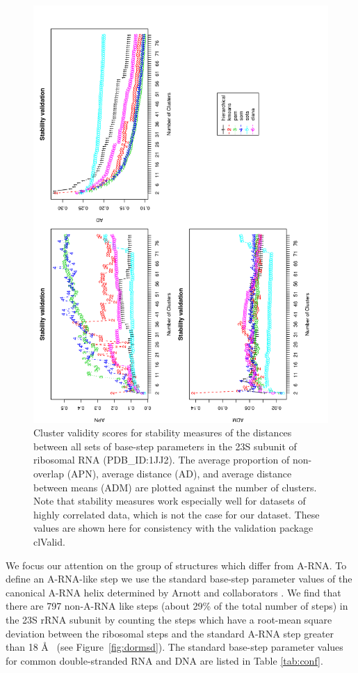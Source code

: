 \begin{figure}
 \centering
\includegraphics[angle=0, scale=0.34]{Chapter2/STval_sta.png}
\caption{Cluster  validity  scores   for  stability  measures  of  the
  distances  between  all sets  of  base-step  parameters  in the  23S
  subunit of  ribosomal RNA (PDB\_ID:1JJ2). The  average proportion of
  non-overlap  (APN),  average  distance  (AD), and  average  distance
  between  means (ADM)  are plotted  against the  number  of clusters.
  Note that  stability measures work  especially well for  datasets of
  highly  correlated data,  which is  not  the case  for our  dataset.
  These  values are  shown here  for consistency  with  the validation
  package clValid.}
 \label{fig:stability}
\end{figure}

We focus  our attention on the  group of structures  which differ from
A-RNA.  To  define an  A-RNA-like step  we use the  standard base-step
parameter values of the canonical A-RNA helix determined by Arnott and
collaborators \cite{arnott1973}.  We find that there are 797 non-A-RNA
like steps (about  29\% of the total number of steps)  in the 23S rRNA
subunit by counting the steps  which have a root-mean square deviation
between the ribosomal  steps and the standard A-RNA  step greater than
18 \AA~ (see Figure~\ref{fig:dormsd}). The standard base-step parameter
values  for common  double-stranded RNA  and DNA  are listed  in Table
\ref{tab:conf}.

